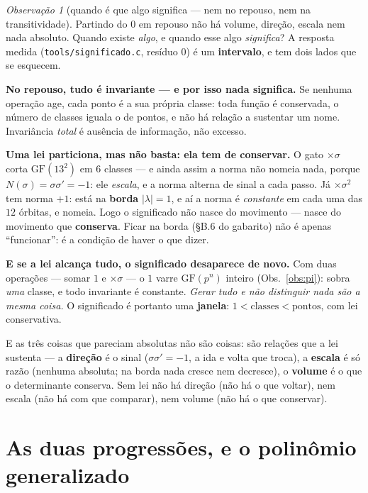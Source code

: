 \documentclass[11pt]{article}
\newcommand{\code}[1]{\texttt{\small #1}}
\newcommand{\GF}{\mathrm{GF}}
\theoremstyle{plain}
\theoremstyle{remark}
\newtheorem{obs}{Observação}
\begin{document}
\begin{obs}[quando é que algo significa --- nem no repouso, nem na transitividade]\label{obs:signif-2}
Partindo do $0$ em repouso não há volume, direção, escala nem nada absoluto. Quando existe \emph{algo},
e quando esse algo \emph{significa}? A resposta medida (\code{tools/significado.c}, resíduo $0$) é um
\textbf{intervalo}, e tem dois lados que se esquecem.

\textbf{No repouso, tudo é invariante --- e por isso nada significa.} Se nenhuma operação age, cada
ponto é a sua própria classe: toda função é conservada, o número de classes iguala o de pontos, e não
há relação a sustentar um nome. Invariância \emph{total} é ausência de informação, não excesso.

\textbf{Uma lei particiona, mas não basta: ela tem de conservar.} O gato $\times\sigma$ corta
$\GF(13^2)$ em $6$ classes --- e ainda assim a norma não nomeia nada, porque $N(\sigma)=\sigma\sigma'=-1$:
ele \emph{escala}, e a norma alterna de sinal a cada passo. Já $\times\sigma^2$ tem norma $+1$: está na
\textbf{borda} $|\lambda|=1$, e aí a norma é \emph{constante} em cada uma das $12$ órbitas, e nomeia.
Logo o significado não nasce do movimento --- nasce do movimento que \textbf{conserva}. Ficar na borda
(§B.6 do gabarito) não é apenas ``funcionar'': é a condição de haver o que dizer.

\textbf{E se a lei alcança tudo, o significado desaparece de novo.} Com duas operações --- somar $1$ e
$\times\sigma$ --- o $1$ varre $\GF(p^n)$ inteiro (Obs.~\ref{obs:pi}): sobra \emph{uma} classe, e todo
invariante é constante. \emph{Gerar tudo e não distinguir nada são a mesma coisa.} O significado é
portanto uma \textbf{janela}: $1<\text{classes}<\text{pontos}$, com lei conservativa.

E as três coisas que pareciam absolutas não são coisas: são relações que a lei sustenta --- a
\textbf{direção} é o sinal ($\sigma\sigma'=-1$, a ida e volta que troca), a \textbf{escala} é só razão
(nenhuma absoluta; na borda nada cresce nem decresce), o \textbf{volume} é o que o determinante conserva.
Sem lei não há direção (não há o que voltar), nem escala (não há com que comparar), nem volume (não há o
que conservar).
\end{obs}

\section{As duas progressões, e o polinômio generalizado}
\end{document}
